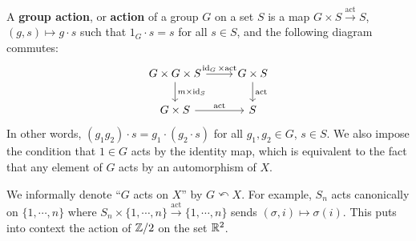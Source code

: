 \begin{definition}[]
    A \textbf{group action}, or \textbf{action} of a group $G$ on a set $S$ is a map $G \times S \xrightarrow{\mathrm{act}} S$, $(g,s) \mapsto g \cdot s$ such that $1_G \cdot s=s$ for all $s \in S$, and the following diagram commutes:
        \[
        \begin{tikzcd}
            G \times G \times S \arrow[d, "m \times \id_S"] \arrow[r,"\id_G \times \mathrm{act}"]&G \times S\arrow[d, "\mathrm{act}"] \\
            G \times S \arrow[r, "\mathrm{act}"] & S 
        \end{tikzcd}
    \] In other words, $(g_1 g_2) \cdot s=g_1 \cdot (g_2 \cdot s)$ for all $g_1,g_2 \in G$, $s \in S$. We also impose the condition that $1 \in G$ acts by the identity map, which is equivalent to the fact that any element of $G$ acts by an automorphism of $X$.
\end{definition}
We informally denote ``$G$ acts on $X$'' by $G\curvearrowleft X$. For example, $S _n $ acts canonically on $\{1,\cdots ,n\} $ where $S _n  \times \{1,\cdots ,n\} \xrightarrow{\mathrm{act}} \{1,\cdots ,n\} $ sends $(\sigma,i) \mapsto  \sigma(i)$. This puts into context the action of $\mathbb{Z} /2$ on the set $\mathbb{R}^2$.
